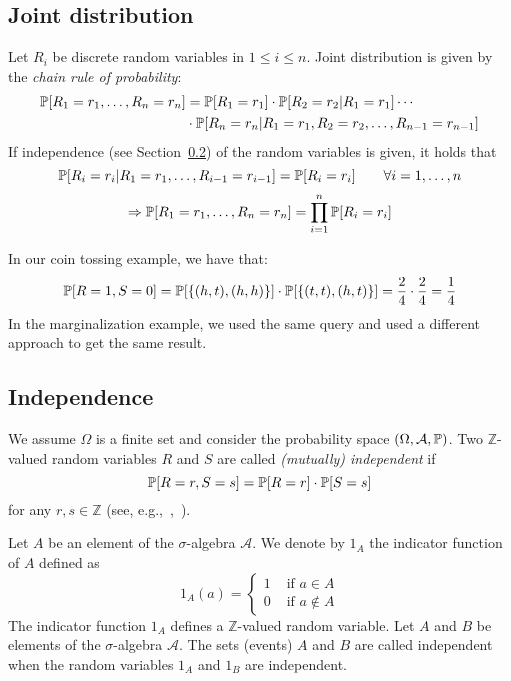 \subsection{Joint distribution}
\label{sec:bp-joint-distribution}
%
\begin{definition}
  Let $R_i$ be discrete random variables in $1 \leq i \leq n$.
  Joint distribution is given by the \emph{chain rule of probability}:
  \begin{align*}
    \mathbb P[R_1=r_1, \ldots, R_n=r_n]
        &= \mathbb P[R_1=r_1] \cdot \mathbb P[R_2=r_2|R_1=r_1] \cdots \\
        &\cdot \mathbb P[R_n=r_n|R_1=r_1,R_2=r_2,\ldots,R_{n-1}=r_{n-1}]
  \end{align*}
  If independence (see Section~\ref{sec:bp-indep}) of the random variables is given, it holds that
  \[ \mathbb P[R_i=r_i|R_1=r_1,\ldots,R_{i-1}=r_{i-1}] = \mathbb P[R_i=r_i] \qquad \forall i=1,\ldots,n \]
  \[ \Rightarrow \mathbb P[R_1=r_1, \ldots, R_n=r_n] = \prod_{i=1}^n \mathbb P[R_i=r_i] \]
\end{definition}
\begin{example}
  In our coin tossing example, we have that:
  \[ \mathbb P[R=1, S=0] = \mathbb P[\left\{(h, t), (h, h)\right\}] \cdot \mathbb P[\left\{(t, t), (h, t)\right\}] = \frac24 \cdot \frac24 = \frac14 \]
  In the marginalization example, we used the same query and used a different approach to get the same result.
\end{example}

\subsection{Independence}
\label{sec:bp-indep}
%
\begin{definition}
  We assume $\Omega$ is a finite set and consider
  the probability space $(\Omega, \mathcal A, \mathbb P)$.
  Two $\mathbb Z$-valued random variables $R$ and $S$ are called \emph{(mutually) independent} if
  \[ \mathbb P[R=r, S=s] = \mathbb P[R=r] \cdot \mathbb P[S=s] \]
  for any $r, s \in {\mathbb Z}$ (see, e.g.,~\cite[p.~27]{ito},~\cite[p.~143]{grindstead}).
\end{definition}

Let $A$ be an element of the $\sigma$-algebra ${\mathcal A}$.
We denote by $1_A$ the indicator function of $A$ defined as
\[
  1_A(a) = \begin{cases}
    1 & \text{ if } a \in A \\
    0 & \text{ if } a \not\in A
  \end{cases}
\]
The indicator function $1_A$ defines a ${\mathbb Z}$-valued random variable.
Let $A$ and $B$ be elements of the $\sigma$-algebra ${\mathcal A}$.
The sets (events) $A$ and $B$ are called independent
when the random variables $1_A$ and $1_B$ are independent.

